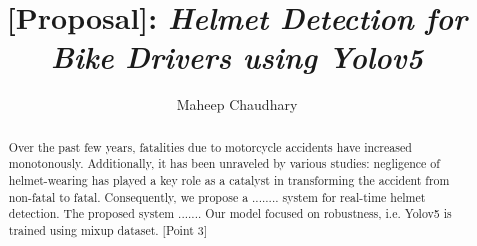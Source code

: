 \documentclass{article}
\title{[\textbf{Proposal}]:\textit{ Helmet Detection for Bike Drivers using Yolov5}}
\author{Maheep Chaudhary}
\date{}
\begin{document}
\maketitle

\begin{abstract}
Over the past few years, 
fatalities due to motorcycle accidents have increased monotonously. 
Additionally, it has been unraveled by various studies: negligence of helmet-wearing has played a key role as a catalyst in transforming the accident from non-fatal to fatal. 
Consequently, we propose a ........ system for real-time helmet detection. 
The proposed system .......
Our model focused on robustness, i.e. Yolov5 is trained using mixup dataset. $[$Point 3$]$

\end{abstract}





\end{document}
